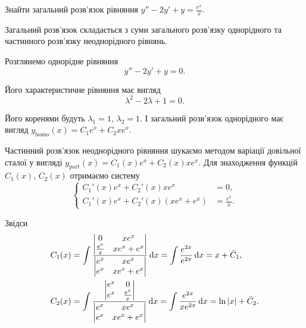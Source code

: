 \begin{example}
	Знайти загальний розв'язок рівняння $y'' - 2 y' + y = \frac{e^x}{x}$.
\end{example}

\begin{solution}
	Загальний розв'язок складається з суми загального роз\-в'яз\-ку однорідного та частинного роз\-в'яз\-ку неоднорідного рівнянь. \parvskip

	Розглянемо однорідне рівняння
	\begin{equation*}
		y'' - 2 y' + y = 0.
	\end{equation*}
	
	Його характеристичне рівняння має вигляд
	\begin{equation*}
		\lambda^2 - 2 \lambda + 1 = 0.
	\end{equation*}

	Його коренями будуть $\lambda_1 = 1$, $\lambda_2 = 1$. І загальний роз\-в'яз\-ок однорідного має вигляд $y_{\text{homo}}(x) = C_1 e^x + C_2 x e^x$.  \parvskip

	Частинний розв'язок неоднорідного рівняння шукаємо методом варіації довільної сталої у вигляді $y_{\text{part}}(x) = C_1(x) e^x + C_2(x) x e^x$. Для знаходження функцій $C_1(x)$, $C_2(x)$ отримаємо систему 
	\begin{equation*}
		\left\{
			\begin{aligned}
				C_1'(x) e^x + C_2'(x) x e^x &= 0, \\
				C_1'(x) e^x + C_2'(x) \left( x e^x + e^x \right) &= \frac{e^x}{x}.
			\end{aligned}
		\right.
	\end{equation*}
	
	Звідси
	\begin{align*}
		C_1(x) &= \int \frac{\begin{vmatrix} 0 & x e^x \\ \frac{e^x}{x} & x e^x + e^x \end{vmatrix}}{\begin{vmatrix} e^x & x e^x \\ e^x & x e^x + e^x \end{vmatrix}} \mathop{}\!\mathrm{d} x = \int \frac{e^{2x}}{e^{2x}} \mathop{}\!\mathrm{d} x = x + \bar C_1, \\
		C_2(x) &= \int \frac{\begin{vmatrix} e^x & 0 \\ e^x & \frac{e^x}{x} \end{vmatrix}}{\begin{vmatrix} e^x & x e^x \\ e^x & x e^x + e^x \end{vmatrix}} \mathop{}\!\mathrm{d} x = \int \frac{e^{2x}}{x e^{2x}} \mathop{}\!\mathrm{d} x = \ln |x| + \bar C_2.
	\end{align*}


\end{solution}
